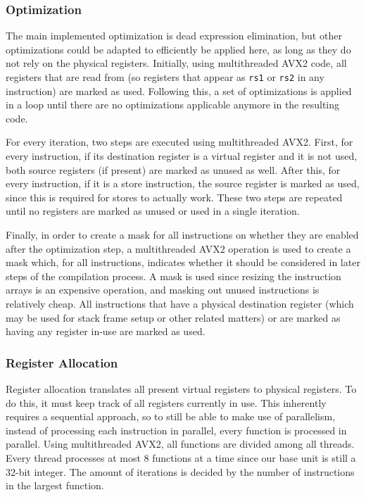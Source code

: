 \documentclass[11pt,dvipsnames]{article}
\newcommand{\mono}[1]{\texttt{#1}}
\begin{document}
\subsubsection{Optimization}
The main implemented optimization is dead expression elimination, but other optimizations could be adapted to efficiently be applied here, as long as they do not rely on the physical registers. Initially, using multithreaded AVX2 code, all registers that are read from (so registers that appear as \mono{rs1} or \mono{rs2} in any instruction) are marked as used. Following this, a set of optimizations is applied in a loop until there are no optimizations applicable anymore in the resulting code.

For every iteration, two steps are executed using multithreaded AVX2. First, for every instruction, if its destination register is a virtual register and it is not used, both source registers (if present) are marked as unused as well. After this, for every instruction, if it is a store instruction, the source register is marked as used, since this is required for stores to actually work. These two steps are repeated until no registers are marked as unused or used in a single iteration.

Finally, in order to create a mask for all instructions on whether they are enabled after the optimization step, a multithreaded AVX2 operation is used to create a mask which, for all instructions, indicates whether it should be considered in later steps of the compilation process. A mask is used since resizing the instruction arrays is an expensive operation, and masking out unused instructions is relatively cheap. All instructions that have a physical destination register (which may be used for stack frame setup or other related matters) or are marked as having any register in-use are marked as used.

\subsubsection{Register Allocation}
Register allocation translates all present virtual registers to physical registers. To do this, it must keep track of all registers currently in use. This inherently requires a sequential approach, so to still be able to make use of parallelism, instead of processing each instruction in parallel, every function is processed in parallel. Using multithreaded AVX2, all functions are divided among all threads. Every thread processes at most 8 functions at a time since our base unit is still a 32-bit integer. The amount of iterations is decided by the number of instructions in the largest function.
\end{document}
